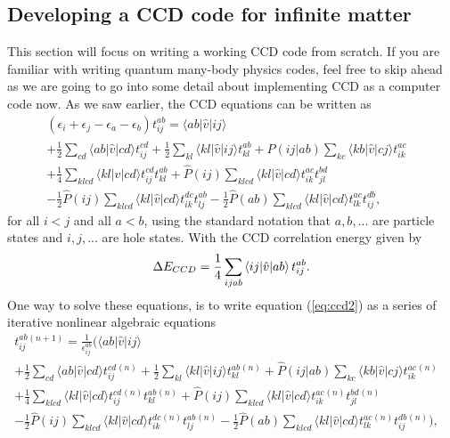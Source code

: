 \subsection{Developing a CCD code for infinite matter}
  This section will focus on writing a working CCD code from
  scratch. If you are familiar with writing quantum many-body physics
  codes, feel free to skip ahead as we are going to go into some
  detail about implementing CCD as a computer code now. As we saw
  earlier, the CCD equations can be written as
  \begin{align}
  \left(\epsilon_i+\epsilon_j-\epsilon_a-\epsilon_b\right)t_{ij}^{ab}
  = \langle ab \vert \hat{v} \vert ij \rangle & \nonumber
  \\ +\frac{1}{2}\sum_{cd} \langle ab \vert \hat{v} \vert cd \rangle
  t_{ij}^{cd}+\frac{1}{2}\sum_{kl} \langle kl \vert \hat{v} \vert ij
  \rangle t_{kl}^{ab}+\hat{P}(ij\vert ab)\sum_{kc} \langle kb \vert
  \hat{v} \vert cj \rangle t_{ik}^{ac} & \nonumber
  \\ +\frac{1}{4}\sum_{klcd} \langle kl \vert \hat{v} \vert cd \rangle
  t_{ij}^{cd}t_{kl}^{ab}+\hat{P}(ij)\sum_{klcd} \langle kl \vert
  \hat{v} \vert cd \rangle t_{ik}^{ac}t_{jl}^{bd}& \nonumber
  \\ -\frac{1}{2}\hat{P}(ij)\sum_{klcd} \langle kl \vert \hat{v} \vert
  cd \rangle t_{ik}^{dc}t_{lj}^{ab}-\frac{1}{2}\hat{P}(ab)\sum_{klcd}
  \langle kl \vert \hat{v} \vert cd \rangle t_{lk}^{ac}t_{ij}^{db},&
  \label{eq:ccd2}
  \end{align}
  for all $i < j$ and all $a < b$, using the standard notation that
  $a,b,...$ are particle states and $i,j,...$ are hole states. With
  the CCD correlation energy given by
  \begin{equation}
  \Delta E_{CCD} = \frac{1}{4} \sum_{ijab}
  \braket{ij|\hat{v}|ab}t^{ab}_{ij}.
  \label{eq:ccdcorr}
  \end{equation}
  One way to solve these equations, is to write equation
  (\ref{eq:ccd2}) as a series of iterative nonlinear algebraic
  equations
  \begin{align}
  t_{ij}^{ab}{}^{(n+1)} = \frac{1}{\epsilon^{ab}_{ij}} \bigg(\langle
  ab \vert \hat{v} \vert ij \rangle & \nonumber
  \\ +\frac{1}{2}\sum_{cd} \langle ab \vert \hat{v} \vert cd \rangle
  t_{ij}^{cd}{}^{(n)}+\frac{1}{2}\sum_{kl} \langle kl \vert \hat{v}
  \vert ij \rangle t_{kl}^{ab}{}^{(n)}+\hat{P}(ij\vert ab)\sum_{kc}
  \langle kb \vert \hat{v} \vert cj \rangle t_{ik}^{ac}{}^{(n)} &
  \nonumber \\ +\frac{1}{4}\sum_{klcd} \langle kl \vert \hat{v} \vert
  cd \rangle
  t_{ij}^{cd}{}^{(n)}t_{kl}^{ab}{}^{(n)}+\hat{P}(ij)\sum_{klcd}
  \langle kl \vert \hat{v} \vert cd \rangle
  t_{ik}^{ac}{}^{(n)}t_{jl}^{bd}{}^{(n)}& \nonumber
  \\ -\frac{1}{2}\hat{P}(ij)\sum_{klcd} \langle kl \vert \hat{v} \vert
  cd \rangle
  t_{ik}^{dc}{}^{(n)}t_{lj}^{ab}{}^{(n)}-\frac{1}{2}\hat{P}(ab)\sum_{klcd}
  \langle kl \vert \hat{v} \vert cd \rangle
  t_{lk}^{ac}{}^{(n)}t_{ij}^{db}{}^{(n)} \bigg),&
  \label{eq:ccd3}
  \end{align}
